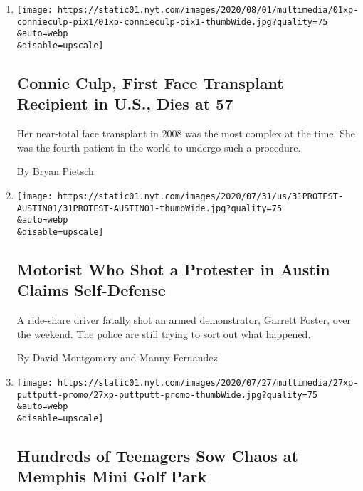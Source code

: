 \begin{enumerate}
\def\labelenumi{\arabic{enumi}.}
\item
  \href{/2020/08/01/us/Connie-culp-dead-face-transplant.html}{}

  \texttt{[image: https://static01.nyt.com/images/2020/08/01/multimedia/01xp-connieculp-pix1/01xp-connieculp-pix1-thumbWide.jpg?quality=75\\\&auto=webp\\\&disable=upscale]}

  \hypertarget{connie-culp-first-face-transplant-recipient-in-us-dies-at-57}{%
  \subsection{Connie Culp, First Face Transplant Recipient in U.S., Dies
  at
  57}\label{connie-culp-first-face-transplant-recipient-in-us-dies-at-57}}

  Her near-total face transplant in 2008 was the most complex at the
  time. She was the fourth patient in the world to undergo such a
  procedure.

  By Bryan Pietsch
\item
  \href{/2020/07/31/us/austin-protest-shooting-foster-perry.html}{}

  \texttt{[image: https://static01.nyt.com/images/2020/07/31/us/31PROTEST-AUSTIN01/31PROTEST-AUSTIN01-thumbWide.jpg?quality=75\\\&auto=webp\\\&disable=upscale]}

  \hypertarget{motorist-who-shot-a-protester-in-austin-claims-self-defense}{%
  \subsection{Motorist Who Shot a Protester in Austin Claims
  Self-Defense}\label{motorist-who-shot-a-protester-in-austin-claims-self-defense}}

  A ride-share driver fatally shot an armed demonstrator, Garrett
  Foster, over the weekend. The police are still trying to sort out what
  happened.

  By David Montgomery and Manny Fernandez
\item
  \href{/2020/07/27/us/teens-memphis-crowded-mini-golf.html}{}

  \texttt{[image: https://static01.nyt.com/images/2020/07/27/multimedia/27xp-puttputt-promo/27xp-puttputt-promo-thumbWide.jpg?quality=75\\\&auto=webp\\\&disable=upscale]}

  \hypertarget{hundreds-of-teenagers-sow-chaos-at-memphis-mini-golf-park}{%
  \subsection{Hundreds of Teenagers Sow Chaos at Memphis Mini Golf
  Park}\label{hundreds-of-teenagers-sow-chaos-at-memphis-mini-golf-park}}


\end{enumerate}
